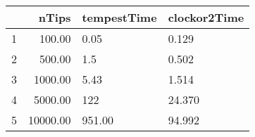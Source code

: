 \begin{table}[ht]
\centering
\begin{tabular}{rrll}
  \hline
 & nTips & tempestTime & clockor2Time \\ 
  \hline
1 & 100.00 & 0.05 & 0.129 \\ 
  2 & 500.00 & 1.5 & 0.502 \\ 
  3 & 1000.00 & 5.43 & 1.514 \\ 
  4 & 5000.00 & 122 & 24.370 \\ 
  5 & 10000.00 & 951.00 & 94.992 \\ 
   \hline
\end{tabular}
\end{table}

